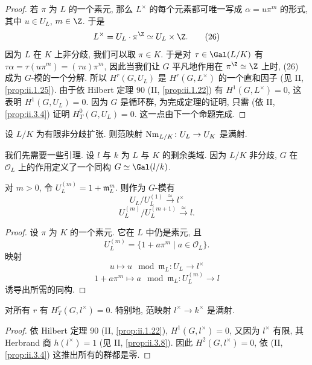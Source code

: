\begin{proof}
若 $\pi$ 为 $L$ 的一个素元, 那么 $L^\times$ 的每个元素都可唯一写成 $\alpha=u\pi^m$ 的形式, 其中 $u\in U_L$, $m\in\Z$. 于是
\begin{equation}
 L^\times=U_L\cdot\pi^{\Z}\simeq U_L\times\Z.\tag{26}
\end{equation}
因为 $L$ 在 $K$ 上非分歧, 我们可以取 $\pi\in K$. 于是对 $\tau\in\Gal(L/K)$ 有 $\tau\alpha=\tau(u\pi^m)=(\tau u)\pi^m$, 因此当我们让 $G$ 平凡地作用在 $\pi^{\Z}\simeq\Z$ 上时, (26) 成为 $G$-模的一个分解. 所以 $H^r(G,U_L)$ 是 $H^r(G,L^\times)$ 的一个直和因子 (见 II, \ref{prop:ii.1.25}). 由于依 Hilbert 定理 90 (II, \ref{prop:ii.1.22}) 有 $H^1(G,L^\times)=0$, 这表明 $H^1(G,U_L)=0$. 因为 $G$ 是循环群, 为完成定理的证明, 只需 (依 II, \ref{prop:ii.3.4}) 证明 $H_T^0(G,U_L)=0$. 这一点由下一个命题完成.
\end{proof}

\begin{proposition}\label{prop:iii.1.2}
设 $L/K$ 为有限非分歧扩张. 则范映射 $\operatorname{Nm}_{L/K}\colon U_L\to U_K$ 是满射.
\end{proposition}

我们先需要一些引理. 设 $l$ 与 $k$ 为 $L$ 与 $K$ 的剩余类域. 因为 $L/K$ 非分歧, $G$ 在 $\mathcal{O}_L$ 上的作用定义了一个同构 $G\simeq\Gal(l/k)$.

\begin{lemma}\label{lem:iii.1.3}
对 $m>0$, 令 $U_L^{(m)}=1+\mathfrak{m}_L^m$. 则作为 $G$-模有
\[
 U_L/U_L^{(1)}\xrightarrow{\simeq} l^\times
\]
\[
 U_L^{(m)}/U_L^{(m+1)}\xrightarrow{\simeq} l .
\]
\end{lemma}

\begin{proof}
设 $\pi$ 为 $K$ 的一个素元. 它在 $L$ 中仍是素元, 且
\[
 U_L^{(m)}=\{1+a\pi^m\mid a\in\mathcal{O}_L\}.
\]
映射
\[
 u\mapsto u\mod\mathfrak{m}_L\colon U_L\to l^\times
\]
\[
 1+a\pi^m\mapsto a\mod\mathfrak{m}_L\colon U_L^{(m)}\to l
\]
诱导出所需的同构.
\end{proof}

\begin{lemma}\label{lem:iii.1.4}
对所有 $r$ 有 $H_T^r(G,l^\times)=0$. 特别地, 范映射 $l^\times\to k^\times$ 是满射.
\end{lemma}

\begin{proof}
依 Hilbert 定理 90 (II, \ref{prop:ii.1.22}), $H^1(G,l^\times)=0$, 又因为 $l^\times$ 有限, 其 Herbrand 商 $h(l^\times)=1$ (见 II, \ref{prop:ii.3.8}). 因此 $H^2(G,l^\times)=0$, 依 (II, \ref{prop:ii.3.4}) 这推出所有的群都是零.
\end{proof}

